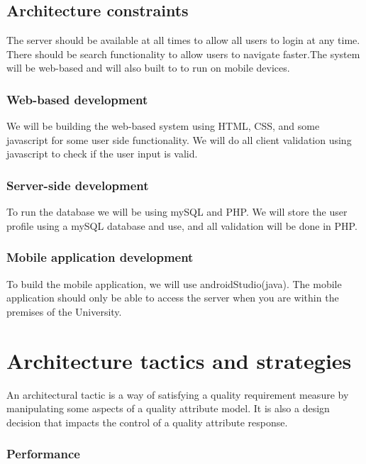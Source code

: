 \documentclass[a4paper,12pt]{report}
\begin{document}
\subsection{Architecture constraints}

The server should be available at all times to allow all users to login at any time. There should be search functionality to allow users to navigate faster.The system will be web-based and will also built to to run on mobile devices.

\subsubsection{Web-based development}

We will be building the web-based system using HTML, CSS, and some javascript for some user side functionality. We will do all client validation using javascript to check if the user input is valid.  

\subsubsection{Server-side development}

To run the database we will be using mySQL and PHP. We will store the user profile using a mySQL database and use, and all validation will be done in PHP.


\subsubsection{Mobile application development}

To build the mobile application, we will use androidStudio(java). The mobile application should only be able to access the server when you are within the premises of the University.


\section{Architecture tactics and strategies}

An architectural tactic is a way of satisfying a quality requirement measure by manipulating some aspects of a quality attribute model. It is also a design decision that impacts the control of a quality attribute response.

\subsubsection{Performance}
\end{document}
